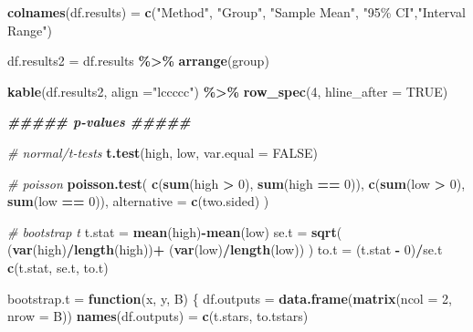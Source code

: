\documentclass[
]{article}
\newenvironment{Shaded}{\begin{snugshade}}{\end{snugshade}}
\newcommand{\AttributeTok}[1]{\textcolor[rgb]{0.13,0.29,0.53}{#1}}
\newcommand{\CommentTok}[1]{\textcolor[rgb]{0.56,0.35,0.01}{\textit{#1}}}
\newcommand{\ConstantTok}[1]{\textcolor[rgb]{0.56,0.35,0.01}{#1}}
\newcommand{\ControlFlowTok}[1]{\textcolor[rgb]{0.13,0.29,0.53}{\textbf{#1}}}
\newcommand{\DecValTok}[1]{\textcolor[rgb]{0.00,0.00,0.81}{#1}}
\newcommand{\DocumentationTok}[1]{\textcolor[rgb]{0.56,0.35,0.01}{\textbf{\textit{#1}}}}
\newcommand{\FunctionTok}[1]{\textcolor[rgb]{0.13,0.29,0.53}{\textbf{#1}}}
\newcommand{\NormalTok}[1]{#1}
\newcommand{\OtherTok}[1]{\textcolor[rgb]{0.56,0.35,0.01}{#1}}
\newcommand{\SpecialCharTok}[1]{\textcolor[rgb]{0.81,0.36,0.00}{\textbf{#1}}}
\newcommand{\StringTok}[1]{\textcolor[rgb]{0.31,0.60,0.02}{#1}}
\begin{document}
\begin{Shaded}
\begin{Highlighting}[]
\FunctionTok{colnames}\NormalTok{(df.results) }\OtherTok{=} \FunctionTok{c}\NormalTok{(}\StringTok{"Method"}\NormalTok{, }\StringTok{"Group"}\NormalTok{, }\StringTok{"Sample Mean"}\NormalTok{, }\StringTok{"95\% CI"}\NormalTok{,}\StringTok{"Interval Range"}\NormalTok{)}

\NormalTok{df.results2 }\OtherTok{=}\NormalTok{ df.results }\SpecialCharTok{\%\textgreater{}\%}
    \FunctionTok{arrange}\NormalTok{(group)}

\FunctionTok{kable}\NormalTok{(df.results2, }\AttributeTok{align =}\StringTok{"lccccc"}\NormalTok{) }\SpecialCharTok{\%\textgreater{}\%}
    \FunctionTok{row\_spec}\NormalTok{(}\DecValTok{4}\NormalTok{, }\AttributeTok{hline\_after =} \ConstantTok{TRUE}\NormalTok{)}

\DocumentationTok{\#\#\#\#\# p{-}values \#\#\#\#\#}

\CommentTok{\# normal/t{-}tests}
\FunctionTok{t.test}\NormalTok{(high, low, }\AttributeTok{var.equal =} \ConstantTok{FALSE}\NormalTok{)}

\CommentTok{\# poisson}
\FunctionTok{poisson.test}\NormalTok{(}
    \FunctionTok{c}\NormalTok{(}\FunctionTok{sum}\NormalTok{(high }\SpecialCharTok{\textgreater{}} \DecValTok{0}\NormalTok{), }\FunctionTok{sum}\NormalTok{(high }\SpecialCharTok{==} \DecValTok{0}\NormalTok{)),}
    \FunctionTok{c}\NormalTok{(}\FunctionTok{sum}\NormalTok{(low }\SpecialCharTok{\textgreater{}} \DecValTok{0}\NormalTok{), }\FunctionTok{sum}\NormalTok{(low }\SpecialCharTok{==} \DecValTok{0}\NormalTok{)),}
    \AttributeTok{alternative =} \FunctionTok{c}\NormalTok{(}\StringTok{\textquotesingle{}two.sided\textquotesingle{}}\NormalTok{)}
\NormalTok{)}

\CommentTok{\# bootstrap t}
\NormalTok{t.stat }\OtherTok{=} \FunctionTok{mean}\NormalTok{(high)}\SpecialCharTok{{-}}\FunctionTok{mean}\NormalTok{(low)}
\NormalTok{se.t }\OtherTok{=} \FunctionTok{sqrt}\NormalTok{(}
\NormalTok{    (}\FunctionTok{var}\NormalTok{(high)}\SpecialCharTok{/}\FunctionTok{length}\NormalTok{(high))}\SpecialCharTok{+}
\NormalTok{    (}\FunctionTok{var}\NormalTok{(low)}\SpecialCharTok{/}\FunctionTok{length}\NormalTok{(low))}
\NormalTok{)}
\NormalTok{to.t }\OtherTok{=}\NormalTok{ (t.stat }\SpecialCharTok{{-}} \DecValTok{0}\NormalTok{)}\SpecialCharTok{/}\NormalTok{se.t}
\FunctionTok{c}\NormalTok{(t.stat, se.t, to.t)}

\NormalTok{bootstrap.t }\OtherTok{=} \ControlFlowTok{function}\NormalTok{(x, y, B) \{}
\NormalTok{    df.outputs }\OtherTok{=} \FunctionTok{data.frame}\NormalTok{(}\FunctionTok{matrix}\NormalTok{(}\AttributeTok{ncol =} \DecValTok{2}\NormalTok{, }\AttributeTok{nrow =}\NormalTok{ B))}
    \FunctionTok{names}\NormalTok{(df.outputs) }\OtherTok{=} \FunctionTok{c}\NormalTok{(}\StringTok{\textquotesingle{}t.stars\textquotesingle{}}\NormalTok{, }\StringTok{\textquotesingle{}to.tstars\textquotesingle{}}\NormalTok{)}


\end{Highlighting}
\end{Shaded}
\end{document}
